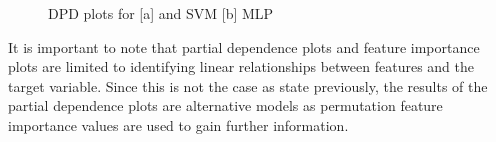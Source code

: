 \begin{figure}
    \begin{tcolorbox}[arc=0pt,boxrule=0.5pt]
        \centering
        \caption{DPD plots for [a] and SVM [b] MLP}
        \label{fig:partial_dependence_plots}
    \end{tcolorbox}
\end{figure}


It is important to note that partial dependence plots and feature importance plots are limited to
identifying linear relationships between features and the target variable.
Since this is not the case as state previously, the results of the partial dependence plots are
alternative models as permutation feature importance values are used to gain further
information.

